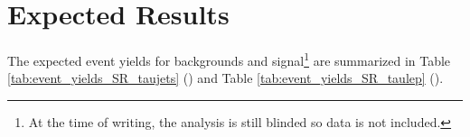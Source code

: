 \begin{table}[!htb]
\begin{center}
{\begin{tabular}{| l | c | c | c | c | c | c |}
        \hline
        \end{tabular}}
        \end{center}
      \end{table}

	\section{Expected Results}\label{sec:results}
		The expected event yields for backgrounds and signal\footnote{At the time of writing, the analysis is still blinded so data is not included.} are summarized in Table \ref{tab:event_yields_SR_taujets} (\taujets) and Table \ref{tab:event_yields_SR_taulep} (\taulep).

